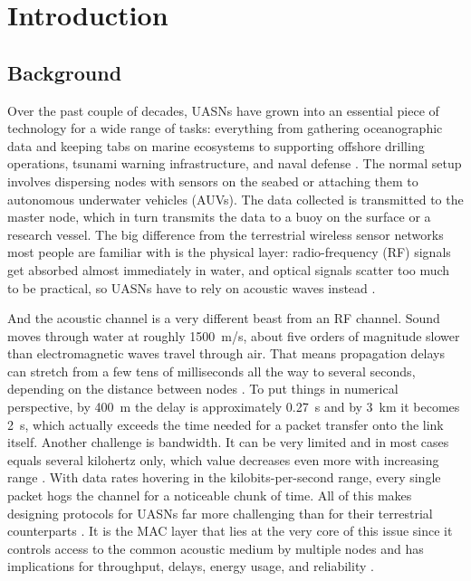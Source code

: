 \documentclass{article}
\begin{document}
\section{Introduction} \label{sec:intro}

\subsection{Background}
Over the past couple of decades, UASNs have grown into an essential piece of technology for a wide range of tasks: everything from gathering oceanographic data and keeping tabs on marine ecosystems to supporting offshore drilling operations, tsunami warning infrastructure, and naval defense \cite{akyildiz2005,casari2011}. The normal setup involves dispersing nodes with sensors on the seabed or attaching them to autonomous underwater vehicles (AUVs). The data collected is transmitted to the master node, which in turn transmits the data to a buoy on the surface or a research vessel. The big difference from the terrestrial wireless sensor networks most people are familiar with is the physical layer: radio-frequency (RF) signals get absorbed almost immediately in water, and optical signals scatter too much to be practical, so UASNs have to rely on acoustic waves instead \cite{akyildiz2005,jiang2018}.

And the acoustic channel is a very different beast from an RF channel. Sound moves through water at roughly 1500~m/s, about five orders of magnitude slower than electromagnetic waves travel through air. That means propagation delays can stretch from a few tens of milliseconds all the way to several seconds, depending on the distance between nodes \cite{akyildiz2005,kulla2022}. To put things in numerical perspective, by 400~m the delay is approximately 0.27~s and by 3~km it becomes 2~s, which actually exceeds the time needed for a packet transfer onto the link itself. Another challenge is bandwidth. It can be very limited and in most cases equals several kilohertz only, which value decreases even more with increasing range \cite{casari2011,jiang2018}. With data rates hovering in the kilobits-per-second range, every single packet hogs the channel for a noticeable chunk of time. All of this makes designing protocols for UASNs far more challenging than for their terrestrial counterparts \cite{akyildiz2005,kulla2022}. It is the MAC layer that lies at the very core of this issue since it controls access to the common acoustic medium by multiple nodes and has implications for throughput, delays, energy usage, and reliability \cite{jiang2018,kulla2022}.
\end{document}

